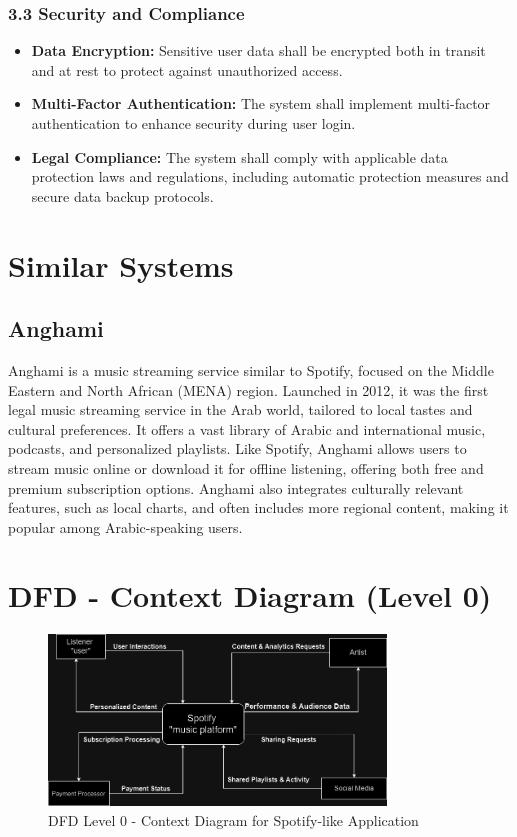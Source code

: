 \documentclass[a4paper,10pt]{article}
\begin{document}
\subsubsection{3.3 Security and Compliance}
    \begin{itemize}[leftmargin=*]
        \item \textbf{Data Encryption:} Sensitive user data shall be encrypted both in transit and at rest to protect against unauthorized access.
        \item \textbf{Multi-Factor Authentication:} The system shall implement multi-factor authentication to enhance security during user login.
        \item \textbf{Legal Compliance:} The system shall comply with applicable data protection laws and regulations, including automatic protection measures and secure data backup protocols.
    \end{itemize}

\section{Similar Systems}
\subsection{Anghami}
Anghami is a music streaming service similar to Spotify, focused on the Middle Eastern and North African (MENA) region. Launched in 2012, it was the first legal music streaming service in the Arab world, tailored to local tastes and cultural preferences. It offers a vast library of Arabic and international music, podcasts, and personalized playlists. Like Spotify, Anghami allows users to stream music online or download it for offline listening, offering both free and premium subscription options. Anghami also integrates culturally relevant features, such as local charts, and often includes more regional content, making it popular among Arabic-speaking users.


\section{DFD - Context Diagram (Level 0)}
\begin{figure}[h!]
    \centering
    \includegraphics[width=0.8\textwidth]{DFD@Dark.drawio.png}
    \caption{DFD Level 0 - Context Diagram for Spotify-like Application}
    \label{fig:dfd-level0}
\end{figure}
\end{document}
